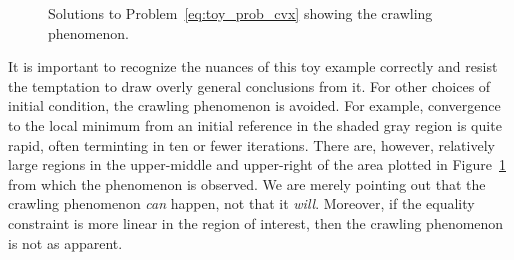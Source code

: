 \documentclass[letterpaper, 10 pt, conference]{ieeeconf}
\begin{document}
\begin{figure}
\centering
{} 
\caption{Solutions to Problem~\eqref{eq:toy_prob_cvx} showing the crawling phenomenon.}
\label{fig:toy_prob_soln}
\end{figure}


It is important to recognize the nuances of this toy example correctly and resist the temptation to draw overly general conclusions from it. For other choices of initial condition, the crawling phenomenon is avoided. For example, convergence to the local minimum from an initial reference in the shaded gray region is quite rapid, often terminting in ten or fewer iterations. There are, however, relatively large regions in the upper-middle and upper-right of the area plotted in Figure~\ref{fig:toy_prob_soln} from which the phenomenon is observed. We are merely pointing out that the crawling phenomenon \textit{can} happen, not that it \textit{will}. Moreover, if the equality constraint is more linear in the region of interest, then the crawling phenomenon is not as apparent.
\end{document}
